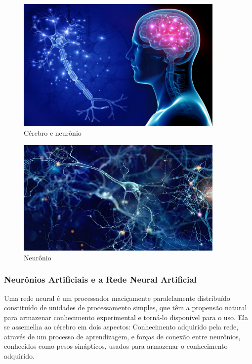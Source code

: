 
    \begin{figure}
    \centering
    \includegraphics[width=0.9\textwidth]{modelo-monografia-rej-2018/img/mw-860.jpg}
    \caption{Cérebro e neurônio}
    \label{fig:Neuro}
    \end{figure}
    
    \begin{figure}
    \centering
    \includegraphics[width=0.9\textwidth]{modelo-monografia-rej-2018/img/neuronio.jpg}
    \caption{Neurônio}
    \label{fig:Neuronio}
    \end{figure}

\subsubsection{Neurônios Artificiais e a Rede Neural Artificial}

 \begin{citacao}
     Uma rede neural é um processador maciçamente paralelamente distribuído constituído de unidades de processamento simples, que têm a propensão natural para armazenar conhecimento experimental e torná-lo disponível para o uso. Ela se assemelha ao cérebro em dois aspectos: Conhecimento adquirido pela rede, através de um processo de aprendizagem, e forças de conexão entre neurônios, conhecidos como pesos sinápticos, usados para armazenar o conhecimento adquirido. 
 \end{citacao}
 
